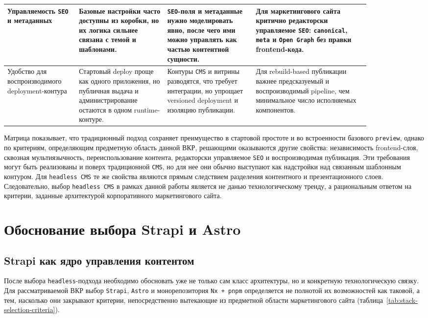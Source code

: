 \begin{longtable}{@{}L{0.17\linewidth}L{0.21\linewidth}L{0.21\linewidth}L{0.27\linewidth}@{}}
  \midrule
  Управляемость \texttt{SEO} и метаданных &
  Базовые настройки часто доступны из коробки, но их логика сильнее связана с темой и шаблонами. &
  \texttt{SEO}-поля и метаданные нужно моделировать явно, после чего ими можно управлять как частью контентной сущности. &
  Для маркетингового сайта критично редакторски управляемое \texttt{SEO}: \texttt{canonical}, \texttt{meta} и \texttt{Open Graph} без правки frontend-кода. \\
  \midrule
  Удобство для воспроизводимого deployment-контура &
  Стартовый deploy проще как одного приложения, но публичная выдача и администрирование остаются в одном runtime-контуре. &
  Контуры \texttt{CMS} и витрины разводятся, что требует интеграции, но упрощает versioned deployment и изоляцию публикации. &
  Для rebuild-based публикации важнее предсказуемый и воспроизводимый pipeline, чем минимальное число исполняемых компонентов. \\
\end{longtable}
\endgroup

Матрица показывает, что традиционный подход сохраняет преимущество в стартовой простоте
и во встроенности базового \texttt{preview}, однако по критериям, определяющим предметную
область данной ВКР, решающими оказываются другие свойства: независимость frontend-слоя,
сквозная мультиязычность, переиспользование контента, редакторски управляемое \texttt{SEO} и
воспроизводимая публикация. Эти требования могут быть реализованы и поверх традиционной
\texttt{CMS}, но для нее они обычно выступают как надстройки над связанным шаблонным
контуром. Для \texttt{headless CMS} те же свойства являются прямым следствием разделения
контентного и презентационного слоев. Следовательно, выбор \texttt{headless CMS} в рамках
данной работы является не данью технологическому тренду, а рациональным ответом на
критерии, заданные архитектурой корпоративного маркетингового сайта.

\section{Обоснование выбора Strapi и Astro}

\subsection{Strapi как ядро управления контентом}

После выбора \texttt{headless}-подхода необходимо обосновать уже не только сам класс
архитектуры, но и конкретную технологическую связку. Для рассматриваемой ВКР выбор
\texttt{Strapi}, \texttt{Astro} и монорепозитория \texttt{Nx + pnpm} определяется не
полнотой их возможностей как таковой, а тем, насколько они закрывают критерии,
непосредственно вытекающие из предметной области маркетингового сайта
(таблица~\ref{tab:stack-selection-criteria}).

